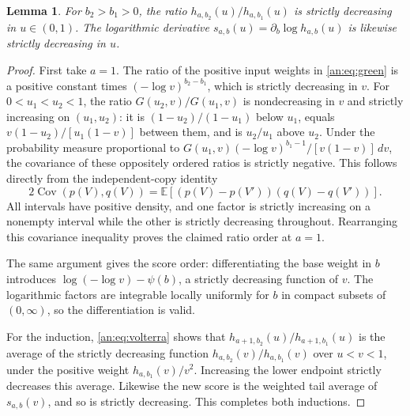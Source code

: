\documentclass[11pt]{article}
\numberwithin{equation}{section}
\theoremstyle{plain}
\newtheorem{lemma}[theorem]{Lemma}
\theoremstyle{definition}
\theoremstyle{remark}
\begin{document}
\begin{lemma}\label{an:lem:border}
For $b_2>b_1>0$, the ratio
$h_{a,b_2}(u)/h_{a,b_1}(u)$ is strictly decreasing in $u\in(0,1)$.
The logarithmic derivative
$s_{a,b}(u)=\partial_b\log h_{a,b}(u)$ is likewise strictly
decreasing in $u$.
\end{lemma}
\begin{proof}
First take $a=1$. The ratio of the positive input weights in
\eqref{an:eq:green} is a positive constant times
$(-\log v)^{b_2-b_1}$, which is strictly decreasing in $v$.
For $0<u_1<u_2<1$, the ratio $G(u_2,v)/G(u_1,v)$ is
nondecreasing in $v$ and strictly increasing on $(u_1,u_2)$:
it is $(1-u_2)/(1-u_1)$ below $u_1$, equals
$v(1-u_2)/[u_1(1-v)]$ between them, and is $u_2/u_1$ above $u_2$.
Under the probability measure proportional to
$G(u_1,v)(-\log v)^{b_1-1}/[v(1-v)]\,dv$, the covariance of these
oppositely ordered ratios is strictly negative. This follows directly
from the independent-copy identity
\[
 2\operatorname{Cov}(p(V),q(V))
 =\mathbb E[(p(V)-p(V'))(q(V)-q(V'))].
\]
All intervals have positive density, and one factor is strictly
increasing on a nonempty interval while the other is strictly
decreasing throughout. Rearranging this covariance inequality proves
the claimed ratio order at $a=1$.

The same argument gives the score order: differentiating the base
weight in $b$ introduces
$\log(-\log v)-\psi(b)$, a strictly decreasing function of $v$.
The logarithmic factors are integrable locally uniformly for $b$ in
compact subsets of $(0,\infty)$, so the differentiation is valid.

For the induction, \eqref{an:eq:volterra} shows that
$h_{a+1,b_2}(u)/h_{a+1,b_1}(u)$ is the average of the strictly
decreasing function $h_{a,b_2}(v)/h_{a,b_1}(v)$ over $u<v<1$,
under the positive weight $h_{a,b_1}(v)/v^2$. Increasing the lower
endpoint strictly decreases this average. Likewise the new score is
the weighted tail average of $s_{a,b}(v)$, and so is strictly
decreasing. This completes both inductions.
\end{proof}
\end{document}
